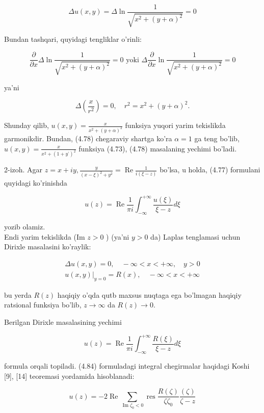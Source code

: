 \documentclass[10pt]{article}
\begin{document}
$$
\Delta u(x, y)=\Delta \ln \frac{1}{\sqrt{x^{2}+(y+\alpha)^{2}}}=0
$$

Bundan tashqari, quyidagi tengliklar o'rinli:

$$
\frac{\partial}{\partial x} \Delta \ln \frac{1}{\sqrt{x^{2}+(y+\alpha)^{2}}}=0 \text { yoki } \Delta \frac{\partial}{\partial x} \ln \frac{1}{\sqrt{x^{2}+(y+\alpha)^{2}}}=0
$$

ya'ni

$$
\Delta\left(\frac{x}{r^{2}}\right)=0, \quad r^{2}=x^{2}+(y+\alpha)^{2} .
$$

Shunday qilib, $u(x, y)=\frac{x}{x^{2}+(y+\alpha)^{2}}$ funksiya yuqori yarim tekislikda garmonikdir. Bundan, (4.78) chegaraviy shartga ko'ra $\alpha=1$ ga teng bo'lib, $u(x, y)=\frac{x}{x^{2}+\left(1+y^{\prime}\right)^{2}}$ funksiya (4.73), (4.78) masalaning yechimi bo'ladi.

2-izoh. Agar $z=x+i y, \frac{y}{(x-\xi)^{2}+y^{2}}=\operatorname{Re} \frac{1}{i(\xi-z)}$ bo'lsa, u holda, (4.77) formulani quyidagi ko'rinishda


\begin{equation*}
u(z)=\operatorname{Re} \frac{1}{\pi i} \int_{-\infty}^{+\infty} \frac{u(\xi)}{\xi-z} d \xi \tag{4.83}
\end{equation*}


yozib olamiz.\\
Endi yarim tekislikda (Im $z>0$ ) (ya'ni $y>0$ da) Laplas tenglamasi uchun Dirixle masalasini ko'raylik:

$$
\begin{gathered}
\Delta u(x, y)=0, \quad-\infty<x<+\infty, \quad y>0 \\
\left.u(x, y)\right|_{y=0}=R(x), \quad-\infty<x<+\infty
\end{gathered}
$$

bu yerda $R(z)$ haqiqiy o'qda qutb maxsus nuqtaga ega bo'lmagan haqiqiy ratsional funksiya bo'lib, $z \rightarrow \infty$ da $R(z) \rightarrow 0$.

Berilgan Dirixle masalasining yechimi


\begin{equation*}
u(z)=\operatorname{Re} \frac{1}{\pi i} \int_{-\infty}^{+\infty} \frac{R(\xi)}{\xi-z} d \xi \tag{4.84}
\end{equation*}


formula orqali topiladi. (4.84) formuladagi integral chegirmalar haqidagi Koshi [9], [14] teoremasi yordamida hisoblanadi:


\begin{equation*}
u(z)=-2 \operatorname{Re} \sum_{\operatorname{Im} \zeta_{0}<0} \operatorname{res} \frac{R(\zeta)}{\zeta \zeta_{0}} \frac{(\zeta)}{\zeta-z} \tag{4.85}
\end{equation*}
\end{document}
